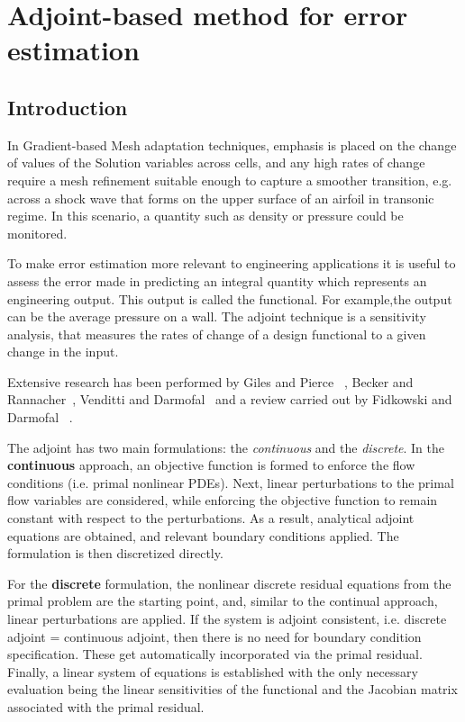 \section{Adjoint-based method for error estimation}
\label{section:Adjoint}
\subsection{Introduction}

In Gradient-based Mesh adaptation techniques, emphasis is placed on the change of values of the Solution variables across cells, and any high rates of change require a mesh refinement suitable enough to capture a smoother transition, e.g. across a shock wave that forms on the upper surface of an airfoil in transonic regime. In this scenario, a quantity such as density or pressure could be monitored.\par

To make error estimation more relevant to engineering applications it is useful to assess the error made in predicting an integral quantity which represents an engineering output. This output is called the functional. For example,the output can be the average pressure on a wall. The adjoint technique is a sensitivity analysis, that measures the rates of change of a design functional to a given change in the input. \par

Extensive research has been performed by Giles and Pierce ~\cite{Giles:2000}, Becker and Rannacher~\cite{Becker:2001}, Venditti and Darmofal~\cite{Venditti:2000, Venditti:2002} and a review carried out by Fidkowski and Darmofal ~\cite{Fidkowski:2011}.

The adjoint has two main formulations: the \textit{continuous} and the \textit{discrete}. In the \textbf{continuous} approach, an objective function is formed to enforce the flow conditions (i.e. primal nonlinear PDEs). Next, linear perturbations to the primal flow variables are considered, while enforcing the objective function to remain constant with respect to the perturbations. As a result, analytical adjoint equations are obtained, and relevant boundary conditions applied. The formulation is then discretized directly. \par

For the \textbf{discrete} formulation, the nonlinear discrete residual equations from the primal problem are the starting point, and, similar to the continual approach, linear perturbations are applied. If the system is adjoint consistent, i.e. discrete adjoint = continuous adjoint, then there is no need for boundary condition specification. These get automatically incorporated via the primal residual. Finally, a linear system of equations is established with the only necessary evaluation being the linear sensitivities of the functional and the Jacobian matrix associated with the primal residual. \par

